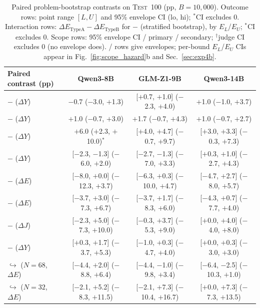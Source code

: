 \begin{table}[!t]
\centering
\caption{Paired problem-bootstrap contrasts on \textsc{Test}~100 (pp, $B{=}10{,}000$). Outcome rows: point range $[L,U]$ and 95\% envelope CI (lo, hi); $^*$CI excludes 0. Interaction rows: $\Delta E_{\mathrm{TypeA}}{-}\Delta E_{\mathrm{TypeB}}$ for \pGRD$-$\pREQ{} (stratified bootstrap), by $E_L$/$E_U$; $^*$CI excludes 0. Scope rows: 95\% envelope CI / primary / secondary; $^\dagger$judge CI excludes 0 (no envelope does). \TA/\TB{} rows give envelopes; per-bound $E_L$/$E_U$ CIs appear in Fig.~\ref{fig:scope_hazard}b and Sec.~\ref{sec:exp4b}.}
\label{tab:paired_contrasts}
\footnotesize
\setlength{\tabcolsep}{4.0pt}
\renewcommand{\arraystretch}{0.96}
\begin{tabular}{@{}lccc@{}}
\toprule
Paired contrast (pp) & Qwen3-8B & GLM-Z1-9B & Qwen3-14B \\
\midrule
\pFULL{} $-$ \pCON{} ($\Delta Y$) & $-$0.7 ($-$3.0, $+$1.3) & [$+$0.7, $+$1.0] ($-$2.3, $+$4.0) & $+$1.0 ($-$1.0, $+$3.7) \\
\pCON{} $-$ \pCONM{} ($\Delta Y$) & $+$1.0 ($-$0.7, $+$3.0) & $+$1.7 ($-$0.7, $+$4.3) & $+$1.0 ($-$0.7, $+$2.7) \\
\pCONM{} $-$ \pFREE{} ($\Delta Y$) & $+$6.0 ($+$2.3, $+$10.0)$^*$ & [$+$4.0, $+$4.7] ($-$0.7, $+$9.7) & [$+$3.0, $+$3.3] ($-$0.3, $+$7.3) \\
\pREQ{} $-$ \pFREE{} ($\Delta Y$) & [$-$2.3, $-$1.3] ($-$6.0, $+$2.0) & [$-$2.7, $-$1.3] ($-$7.0, $+$3.3) & [$+$0.3, $+$1.0] ($-$2.7, $+$4.3) \\
\pREQ{} $-$ \pFREE{} ($\Delta E$) & [$-$8.0, $+$0.0] ($-$12.3, $+$3.7) & [$-$6.3, $+$0.3] ($-$10.0, $+$4.7) & [$-$4.7, $+$2.7] ($-$8.0, $+$5.7) \\
\midrule
\pGRD{} $-$ \pREQ{} ($\Delta E$) & [$-$3.7, $+$3.0] ($-$7.3, $+$6.7) & [$-$3.7, $+$1.7] ($-$8.3, $+$6.0) & [$-$4.3, $+$0.7] ($-$7.7, $+$4.0) \\
\pGRD{} $-$ \pREQ{} ($\Delta J$) & [$-$2.3, $+$5.0] ($-$7.3, $+$10.0) & [$-$0.3, $+$3.7] ($-$5.3, $+$9.0) & [$+$0.0, $+$4.0] ($-$4.0, $+$8.0) \\
\pGRD{} $-$ \pREQ{} ($\Delta Y$) & [$+$0.3, $+$1.7] ($-$3.7, $+$5.3) & [$-$1.0, $+$0.3] ($-$4.7, $+$4.0) & [$+$0.0, $+$0.3] ($-$3.0, $+$3.0) \\
\quad $\hookrightarrow$ \TA{} ($N{=}68$, $\Delta E$) & [$-$4.4, $+$2.0] ($-$8.8, $+$6.4) & [$-$4.4, $-$1.0] ($-$9.8, $+$3.4) & [$-$6.4, $-$2.5] ($-$10.3, $+$1.0) \\
\quad $\hookrightarrow$ \TB{} ($N{=}32$, $\Delta E$) & [$-$2.1, $+$5.2] ($-$8.3, $+$11.5) & [$-$2.1, $+$7.3] ($-$10.4, $+$16.7) & [$+$0.0, $+$7.3] ($-$7.3, $+$13.5) \\

\end{tabular}
\end{table}
